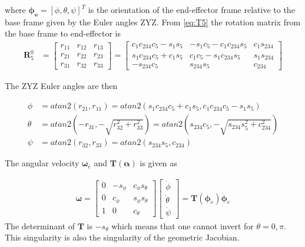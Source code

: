 where $\bm{\phi_e} = [\phi,\theta,\psi]^T$ is the orientation of the end-effector frame relative to the base frame given by the Euler angles ZYZ. From \eqref{eq:T5} the rotation matrix from the base frame to end-effector is
\begin{align*}
    \bm{R}_5^0 &= 
    \begin{bmatrix}
        r_{11} & r_{12} & r_{13}\\
        r_{21} & r_{22} & r_{23}\\
        r_{31} & r_{32} & r_{33}
    \end{bmatrix}
    =
    \begin{bmatrix}
        c_1c_{234}c_5 - s_1s_5 & -s_1c_5 - c_1c_{234}s_5 & c_1s_{234}\\
        s_1c_{234}c_5 + c_1s_5 & c_1c_5 - s_1c_{234}s_5 & s_1s_{234}\\
        -s_{234}c_5 & s_{234}s_5 & c_{234} 
    \end{bmatrix}
\end{align*}

The ZYZ Euler angles are then


\begin{align*}
    \phi &= atan2(r_{21},r_{11}) = atan2(s_1c_{234}c_5 + c_1s_5,c_1c_{234}c_5 - s_1s_5)\\
    \theta &= atan2\left(-r_{31},-\sqrt{r_{32}^2+r_{33}^2}\right) = atan2\left(s_{234}c_5,-\sqrt{s_{234}s_5^2+c_{234}^2}\right)\\
    \psi &= atan2(r_{32},r_{33}) = atan2(s_{234}s_5,c_{234})
\end{align*}

The angular velocity $\bm{\omega}_e$ and $\bm{T}(\bm{\alpha})$ is given as

\begin{align*}
    \bm{\omega} = 
    \begin{bmatrix}
        0 & -s_\phi & c_\phi s_\theta\\
        0 & c_\phi & s_\phi s_\theta\\
        1 & 0 & c_\theta
    \end{bmatrix}
    \begin{bmatrix}
        \dot{\phi}\\\dot{\theta}\\\dot{\psi}
    \end{bmatrix}
    =
    \bm{T}(\bm{\phi}_e)\dot{\bm{\phi}}_e
\end{align*}
The determinant of $\bm{T}$ is $-s_\theta$ which means that one cannot invert for $\theta = 0,\pi$. This singularity is also the singularity of the geometric Jacobian. 







